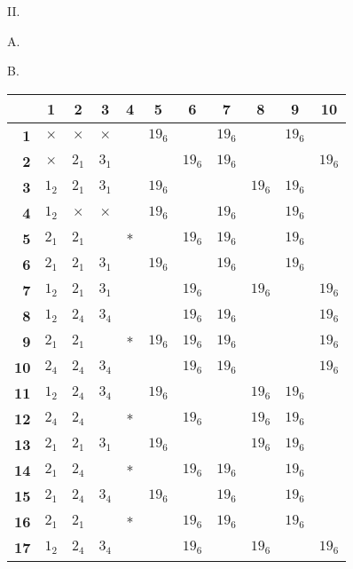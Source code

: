 \documentclass[oneside]{article}
\begin{document}
\begin{center}
\newpage
\large II. \normalsize

\smallskip
A.

B.\
\begin{tabular}{|r|c|c|c|c|c|c|c|c|c|c|} \hline
           &1       &2       &3       &4&5     &6     &7     &8     &9     &10     \\ \hline
\textbf{1} &$\times$&$\times$&$\times$& &$19_6$&      &$19_6$&      &$19_6$&       \\ \hline
\textbf{2} &$\times$&$2_1$   &$3_1$   & &      &$19_6$&$19_6$&      &      &$19_6$ \\ \hline
\textbf{3} &$1_2$   &$2_1$   &$3_1$   & &$19_6$&      &      &$19_6$&$19_6$&       \\ \hline
\textbf{4} &$1_2$   &$\times$&$\times$& &$19_6$&      &$19_6$&      &$19_6$&       \\ \hline
\textbf{5} &$2_1$   &$2_1$   &        &*&      &$19_6$&$19_6$&      &$19_6$&       \\ \hline
\textbf{6} &$2_1$   &$2_1$   &$3_1$   & &$19_6$&      &$19_6$&      &$19_6$&       \\ \hline
\textbf{7} &$1_2$   &$2_1$   &$3_1$   & &      &$19_6$&      &$19_6$&      &$19_6$ \\ \hline
\textbf{8} &$1_2$   &$2_4$   &$3_4$   & &      &$19_6$&$19_6$&      &      &$19_6$ \\ \hline
\textbf{9} &$2_1$   &$2_1$   &        &*&$19_6$&$19_6$&$19_6$&      &      &$19_6$ \\ \hline
\textbf{10}&$2_4$   &$2_4$   &$3_4$   & &      &$19_6$&$19_6$&      &      &$19_6$ \\ \hline
\textbf{11}&$1_2$   &$2_4$   &$3_4$   & &$19_6$&      &      &$19_6$&$19_6$&       \\ \hline
\textbf{12}&$2_4$   &$2_4$   &        &*&      &$19_6$&      &$19_6$&$19_6$&       \\ \hline
\textbf{13}&$2_1$   &$2_1$   &$3_1$   & &$19_6$&      &      &$19_6$&$19_6$&       \\ \hline
\textbf{14}&$2_1$   &$2_4$   &        &*&      &$19_6$&$19_6$&      &$19_6$&       \\ \hline
\textbf{15}&$2_1$   &$2_4$   &$3_4$   & &$19_6$&      &$19_6$&      &$19_6$&       \\ \hline
\textbf{16}&$2_1$   &$2_1$   &        &*&      &$19_6$&$19_6$&      &$19_6$&       \\ \hline
\textbf{17}&$1_2$   &$2_4$   &$3_4$   & &      &$19_6$&      &$19_6$&      &$19_6$ \\ \hline

\end{tabular}
\end{center}
\end{document}
